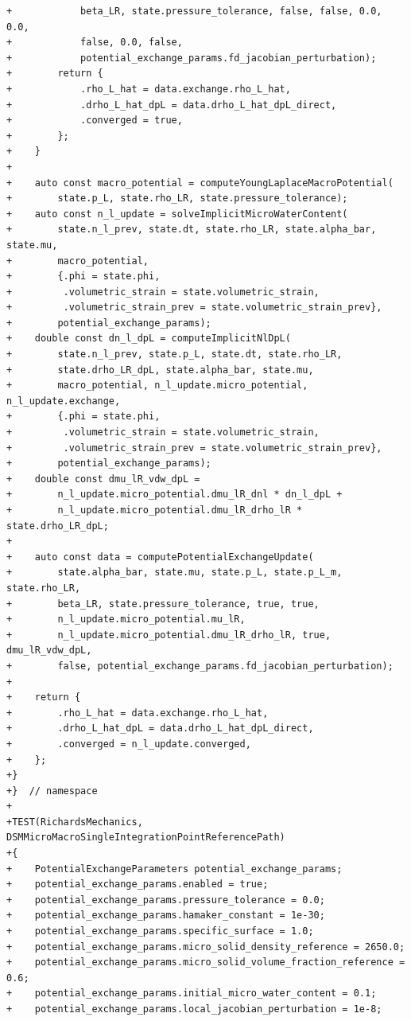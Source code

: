\documentclass[10pt]{article}
\begin{document}
\begin{lstlisting}
+            beta_LR, state.pressure_tolerance, false, false, 0.0, 0.0,
+            false, 0.0, false,
+            potential_exchange_params.fd_jacobian_perturbation);
+        return {
+            .rho_L_hat = data.exchange.rho_L_hat,
+            .drho_L_hat_dpL = data.drho_L_hat_dpL_direct,
+            .converged = true,
+        };
+    }
+
+    auto const macro_potential = computeYoungLaplaceMacroPotential(
+        state.p_L, state.rho_LR, state.pressure_tolerance);
+    auto const n_l_update = solveImplicitMicroWaterContent(
+        state.n_l_prev, state.dt, state.rho_LR, state.alpha_bar, state.mu,
+        macro_potential,
+        {.phi = state.phi,
+         .volumetric_strain = state.volumetric_strain,
+         .volumetric_strain_prev = state.volumetric_strain_prev},
+        potential_exchange_params);
+    double const dn_l_dpL = computeImplicitNlDpL(
+        state.n_l_prev, state.p_L, state.dt, state.rho_LR,
+        state.drho_LR_dpL, state.alpha_bar, state.mu,
+        macro_potential, n_l_update.micro_potential, n_l_update.exchange,
+        {.phi = state.phi,
+         .volumetric_strain = state.volumetric_strain,
+         .volumetric_strain_prev = state.volumetric_strain_prev},
+        potential_exchange_params);
+    double const dmu_lR_vdw_dpL =
+        n_l_update.micro_potential.dmu_lR_dnl * dn_l_dpL +
+        n_l_update.micro_potential.dmu_lR_drho_lR * state.drho_LR_dpL;
+
+    auto const data = computePotentialExchangeUpdate(
+        state.alpha_bar, state.mu, state.p_L, state.p_L_m, state.rho_LR,
+        beta_LR, state.pressure_tolerance, true, true,
+        n_l_update.micro_potential.mu_lR,
+        n_l_update.micro_potential.dmu_lR_drho_lR, true, dmu_lR_vdw_dpL,
+        false, potential_exchange_params.fd_jacobian_perturbation);
+
+    return {
+        .rho_L_hat = data.exchange.rho_L_hat,
+        .drho_L_hat_dpL = data.drho_L_hat_dpL_direct,
+        .converged = n_l_update.converged,
+    };
+}
+}  // namespace
+
+TEST(RichardsMechanics, DSMMicroMacroSingleIntegrationPointReferencePath)
+{
+    PotentialExchangeParameters potential_exchange_params;
+    potential_exchange_params.enabled = true;
+    potential_exchange_params.pressure_tolerance = 0.0;
+    potential_exchange_params.hamaker_constant = 1e-30;
+    potential_exchange_params.specific_surface = 1.0;
+    potential_exchange_params.micro_solid_density_reference = 2650.0;
+    potential_exchange_params.micro_solid_volume_fraction_reference = 0.6;
+    potential_exchange_params.initial_micro_water_content = 0.1;
+    potential_exchange_params.local_jacobian_perturbation = 1e-8;

\end{lstlisting}
\end{document}
